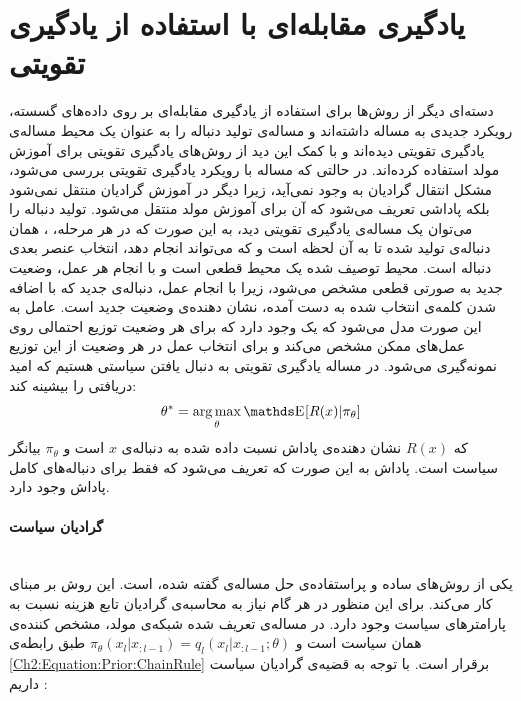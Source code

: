 \section{یادگیری مقابله‌ای با استفاده از یادگیری تقویتی}
 دسته‌ای دیگر از روش‌ها برای استفاده از یادگیری مقابله‌ای بر روی داده‌های گسسته، رویکرد جدیدی به مساله داشته‌اند و مساله‌ی تولید دنباله را به عنوان یک محیط مساله‌ی یادگیری تقویتی دیده‌اند و با کمک این دید از روش‌های یادگیری تقویتی برای آموزش مولد استفاده کرده‌اند. در حالتی که مساله با رویکرد یادگیری تقویتی بررسی می‌شود، مشکل انتقال گرادیان به وجود نمی‌آید، زیرا دیگر در آموزش گرادیان منتقل نمی‌شود بلکه پاداشی تعریف می‌شود که آن برای آموزش مولد منتقل می‌شود.
 \newline
تولید دنباله را می‌توان یک مساله‌ی یادگیری تقویتی دید، به این صورت که در هر مرحله، 
،
همان دنباله‌ی تولید شده تا به آن لحظه است و
که 
می‌تواند انجام دهد، انتخاب عنصر بعدی دنباله است.
محیط توصیف شده یک محیط قطعی است و با انجام هر عمل، وضعیت جدید به صورتی قطعی مشخص می‌شود، زیرا با انجام عمل، دنباله‌ی جدید که با اضافه شدن کلمه‌ی انتخاب شده به دست آمده، نشان دهنده‌ی وضعیت جدید است.
عامل به این صورت مدل می‌شود که یک
وجود دارد که برای هر وضعیت توزیع احتمالی روی عمل‌های ممکن مشخص می‌کند و برای انتخاب عمل در هر وضعیت از این توزیع نمونه‌گیری می‌شود. 
در مساله یادگیری تقویتی به دنبال یافتن سیاستی هستیم که امید 
 دریافتی را بیشینه کند:
\begin{equation}
\theta^* = \argmax_\theta \ME_{} [R(x) | \pi_\theta]
\end{equation}
که 
$R(x)$
 نشان دهنده‌ی پاداش نسبت داده شده به دنباله‌ی $x$ است و $\pi_\theta$ بیانگر سیاست است. پاداش به این صورت که تعریف می‌شود که فقط برای دنباله‌های کامل پاداش وجود دارد.
\paragraph{گرادیان سیاست}\mbox{}\\
یکی از روش‌های ساده و پراستفاده‌ی حل مساله‌ی گفته شده،
است. این روش بر مبنای
کار می‌کند. برای این منظور در هر گام نیاز به محاسبه‌ی گرادیان تابع هزینه نسبت به پارامتر‌های سیاست وجود دارد.
در مساله‌ی تعریف شده شبکه‌ی مولد، مشخص کننده‌ی همان سیاست است و
$\pi_\theta(x_l | x_{:l-1}) = q_l(x_l | x_{:l-1} ; \theta)$
طبق رابطه‌ی
\ref{Ch2:Equation:Prior:ChainRule}
برقرار است.
با توجه به قضیه‌ی گرادیان سیاست داریم
\cite{lin2017adversarial, Sutton99PolicyGradient, SeqGAN}:

